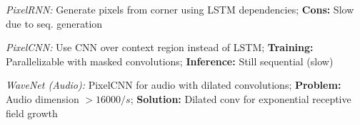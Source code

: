 \emph{PixelRNN:} Generate pixels from corner using LSTM dependencies; \textbf{Cons:} Slow due to seq. generation

\emph{PixelCNN:} Use CNN over context region instead of LSTM; \textbf{Training:} Parallelizable with masked convolutions; \textbf{Inference:} Still sequential (slow)




\emph{WaveNet (Audio):} PixelCNN for audio with dilated convolutions; \textbf{Problem:} Audio dimension $>16000/s$; \textbf{Solution:} Dilated conv for exponential receptive field growth









